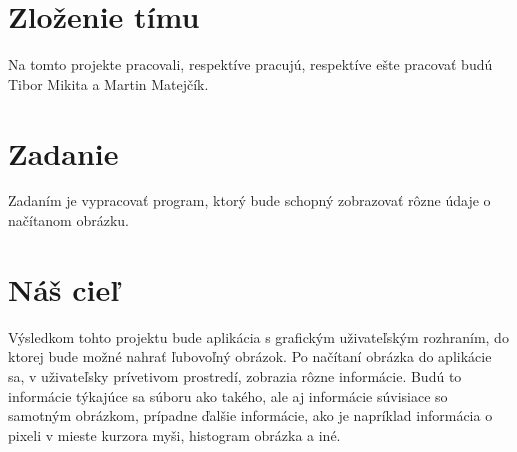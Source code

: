 \documentclass[12pt,a4paper,titlepage,final]{article}
\begin{document}

\def\myauthor{Tibor Mikita}
\def\myemail{xmikit01@stud.fit.vutbr.cz}
\def\projname{Program pre zobrazovanie\\vlastností obrazu}



\pagestyle{plain}
\setcounter{page}{1}
\tableofcontents

\newpage
\pagestyle{plain}
\setcounter{page}{1}

\section{Zloženie tímu} \label{Autori}
Na tomto projekte pracovali, respektíve pracujú, respektíve ešte pracovať budú Tibor Mikita a Martin Matejčík.


\section{Zadanie}
Zadaním je vypracovať program, ktorý bude schopný zobrazovať rôzne údaje o načítanom obrázku.

\section{Náš cieľ}\label{Ciel}
Výsledkom tohto projektu bude aplikácia s grafickým uživateľským rozhraním, do ktorej bude možné nahrať ľubovoľný obrázok. Po načítaní obrázka do aplikácie sa, v uživateľsky prívetivom prostredí, zobrazia rôzne informácie. Budú to informácie týkajúce sa súboru ako takého, ale aj informácie súvisiace so samotným obrázkom, prípadne ďalšie informácie, ako je napríklad informácia o pixeli v mieste kurzora myši, histogram obrázka a iné.
\end{document}
